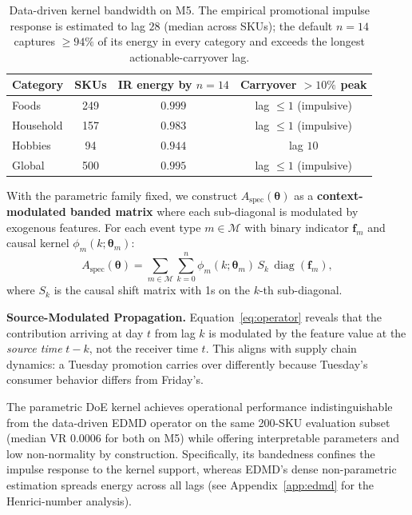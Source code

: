 \documentclass[10pt]{article} %
\theoremstyle{plain}
\theoremstyle{definition}
\newcommand{\Aspec}{A_{\text{spec}}}
\begin{document}
\begin{table}[t]
\centering
\footnotesize
\caption{Data-driven kernel bandwidth on M5. The empirical promotional impulse response is estimated to lag $28$ (median across SKUs); the default $n=14$ captures $\geq 94\%$ of its energy in every category and exceeds the longest actionable-carryover lag.}
\label{tab:bandwidth}
\begin{tabular}{@{}lccc@{}}
\toprule
Category & SKUs & IR energy by $n{=}14$ & Carryover $>10\%$ peak \\
\midrule
Foods & 249 & $0.999$ & lag $\le 1$ (impulsive) \\
Household & 157 & $0.983$ & lag $\le 1$ (impulsive) \\
Hobbies & 94 & $0.944$ & lag $10$ \\
Global & 500 & $0.995$ & lag $\le 1$ (impulsive) \\
\bottomrule
\end{tabular}
\end{table}

With the parametric family fixed, we construct $\Aspec(\boldsymbol{\theta})$ as a \textbf{context-modulated banded matrix} where each sub-diagonal is modulated by exogenous features. For each event type $m \in \mathcal{M}$ with binary indicator $\mathbf{f}_m$ and causal kernel $\phi_m(k; \boldsymbol{\theta}_m)$:
\begin{equation}
\Aspec(\boldsymbol{\theta}) = \sum_{m \in \mathcal{M}} \sum_{k=0}^{n} \phi_m(k; \boldsymbol{\theta}_m) \, S_k \, \operatorname{diag}(\mathbf{f}_m),
\label{eq:operator}
\end{equation}
where $S_k$ is the causal shift matrix with 1s on the $k$-th sub-diagonal.

\textbf{Source-Modulated Propagation.} Equation~\eqref{eq:operator} reveals that the contribution arriving at day $t$ from lag $k$ is modulated by the feature value at the \emph{source time} $t-k$, not the receiver time $t$. This aligns with supply chain dynamics: a Tuesday promotion carries over differently because Tuesday's consumer behavior differs from Friday's.

The parametric DoE kernel achieves operational performance indistinguishable from the data-driven EDMD operator on the same 200-SKU evaluation subset (median VR $0.0006$ for both on M5) while offering interpretable parameters and low non-normality by construction. Specifically, its bandedness confines the impulse response to the kernel support, whereas EDMD's dense non-parametric estimation spreads energy across all lags (see Appendix~\ref{app:edmd} for the Henrici-number analysis).
\end{document}
